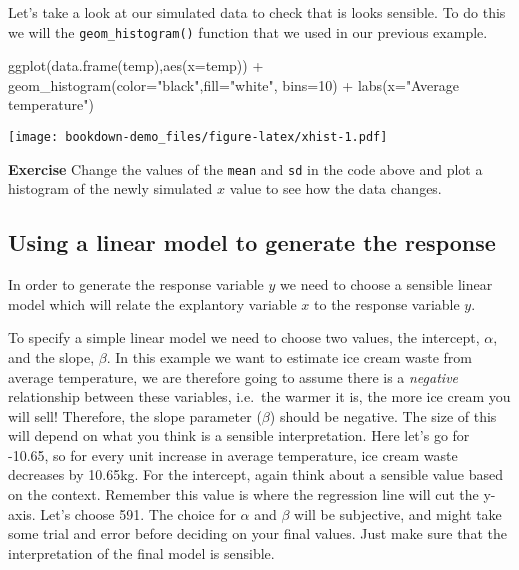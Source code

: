 \documentclass[
]{book}
\newenvironment{Shaded}{\begin{snugshade}}{\end{snugshade}}
\newcommand{\AttributeTok}[1]{\textcolor[rgb]{0.77,0.63,0.00}{#1}}
\newcommand{\DecValTok}[1]{\textcolor[rgb]{0.00,0.00,0.81}{#1}}
\newcommand{\FunctionTok}[1]{\textcolor[rgb]{0.00,0.00,0.00}{#1}}
\newcommand{\NormalTok}[1]{#1}
\newcommand{\SpecialCharTok}[1]{\textcolor[rgb]{0.00,0.00,0.00}{#1}}
\newcommand{\StringTok}[1]{\textcolor[rgb]{0.31,0.60,0.02}{#1}}
\begin{document}
Let's take a look at our simulated data to check that is looks sensible. To do this we will the \texttt{geom\_histogram()} function that we used in our previous example.

\begin{Shaded}
\begin{Highlighting}[]
\FunctionTok{ggplot}\NormalTok{(}\FunctionTok{data.frame}\NormalTok{(temp),}\FunctionTok{aes}\NormalTok{(}\AttributeTok{x=}\NormalTok{temp)) }\SpecialCharTok{+} 
  \FunctionTok{geom\_histogram}\NormalTok{(}\AttributeTok{color=}\StringTok{"black"}\NormalTok{,}\AttributeTok{fill=}\StringTok{"white"}\NormalTok{, }\AttributeTok{bins=}\DecValTok{10}\NormalTok{) }\SpecialCharTok{+} 
            \FunctionTok{labs}\NormalTok{(}\AttributeTok{x=}\StringTok{"Average temperature"}\NormalTok{)}
\end{Highlighting}
\end{Shaded}

\texttt{[image: bookdown-demo\_files/figure-latex/xhist-1.pdf]}

\textbf{Exercise}
Change the values of the \texttt{mean} and \texttt{sd} in the code above and plot a histogram of the newly simulated \(x\) value to see how the data changes.

\hypertarget{using-a-linear-model-to-generate-the-response}{%
\subsection{Using a linear model to generate the response}\label{using-a-linear-model-to-generate-the-response}}

In order to generate the response variable \(y\) we need to choose a sensible linear model which will relate the explantory variable \(x\) to the response variable \(y\).

To specify a simple linear model we need to choose two values, the intercept, \(\alpha\), and the slope, \(\beta\). In this example we want to estimate ice cream waste from average temperature, we are therefore going to assume there is a \emph{negative} relationship between these variables, i.e.~the warmer it is, the more ice cream you will sell! Therefore, the slope parameter (\(\beta\)) should be negative. The size of this will depend on what you think is a sensible interpretation. Here let's go for -10.65, so for every unit increase in average temperature, ice cream waste decreases by 10.65kg. For the intercept, again think about a sensible value based on the context. Remember this value is where the regression line will cut the y-axis. Let's choose 591. The choice for \(\alpha\) and \(\beta\) will be subjective, and might take some trial and error before deciding on your final values. Just make sure that the interpretation of the final model is sensible.
\end{document}
